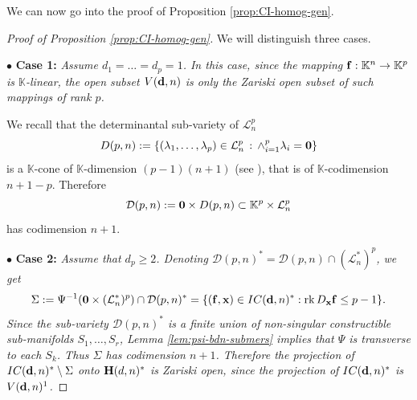 \documentclass[11pt]{amsart}
\newcommand{\field}[1]{\mathbb{#1}}
\newcommand{\K}{\field{K}}
\newcommand{\bbo}{{\bf 0}}
\newcommand{\bd}{{\bf d}}
\newcommand{\bbf}{{\bf f}}
\newcommand{\bH}{{\bf H}}
\newcommand{\bx}{{\bf x}}
\newcommand{\cD}{\mathcal{D}}
\newcommand{\cL}{\mathcal{L}}
\newcommand{\Kn}{{\K^n}}
\newcommand{\Kp}{{\K^p}}
\newcommand{\lbd}{{\lambda}}
\newcommand{\Sgm}{\Sigma}
\numberwithin{equation}{section}
\numberwithin{equation}{section}
\begin{document}
\medskip\noindent
We can now go into the proof of Proposition \ref{prop:CI-homog-gen}.
%
%
\begin{proof}[Proof of Proposition \ref{prop:CI-homog-gen}]
We will distinguish three cases.

\medskip\noindent
$\bullet$ {\bf Case 1:} \em Assume $d_1 = \ldots = d_p =1$. \em In this case,
since the mapping $\bbf :\Kn \to \Kp$ is $\K$-linear, the open subset 
$V(\bd,n)$ is only the Zariski open subset of such mappings of rank $p$. 

\medskip
We recall that the determinantal sub-variety of $\cL_n^p$
$$
D(p,n) : = \{(\lbd_1,\ldots,\lbd_p) \in \cL_n^p \, : \, \wedge_{i=1}^p \lbd_i 
= \bbo  \}
$$
is a $\K$-cone of $\K$-dimension $(p-1)(n+1)$ (see \cite{BrVe}), that is of 
$\K$-codimension $n+1 - p$. Therefore $$
\cD(p,n) :=\bbo\times D(p,n) \subset \K^p\times \cL_n^p
$$
has codimension $n+1$.  

\medskip\noindent
$\bullet$ {\bf Case 2:} \em Assume that $d_p \geq 2$. \em 
Denoting $\cD(p,n)^* = \cD(p,n) \cap (\cL_n^*)^p$, we get
$$
\Sgm:= \Psi^{-1}(\bbo\times (\cL_n^*)^p) \cap \cD(p,n)^* = 
\{(\bbf,\bx) \in IC(\bd,n)^* : {\rm rk}\,D_\bx \bbf \leq p-1\}.
$$
Since the sub-variety $\cD(p,n)^*$ is a finite union of non-singular constructible sub-manifolds $S_1,\ldots,S_r$, Lemma \ref{lem:psi-bdn-submers} implies that 
$\Psi$ is transverse to each $S_k$.  
Thus $\Sigma$ has codimension $n+1$. Therefore the projection of 
$IC(\bd,n)^*\setminus
\Sigma$ onto $\bH(d,n)^*$ is Zariski open, since the projection of 
$IC(\bd,n)^*$ is $V(\bd,n)^1$.  


\end{proof}
\end{document}

